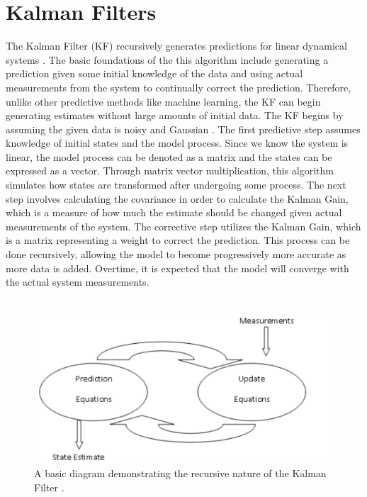 \chapter{Kalman Filters}
\label{Kalman Filters}


The Kalman Filter (KF) recursively generates predictions for linear dynamical systems \cite{inbook}. The basic foundations of the this algorithm include generating a prediction given some initial knowledge of the data and using actual measurements from the system to continually correct the prediction. Therefore,  unlike other predictive methods like machine learning, the KF can begin generating estimates without large amounts of initial data. The KF begins by assuming the given data is noisy and Gaussian \cite{inproceedings, article7}. The first predictive step assumes knowledge of initial states and the model process. Since we know the system is linear, the model process can be denoted as a matrix and the states can be expressed as a vector. Through matrix vector multiplication, this algorithm simulates how states are transformed after undergoing some process. The next step involves calculating the covariance in order to calculate the Kalman Gain, which is a measure of how much the estimate should be changed given actual measurements of the system. The corrective step utilizes the Kalman Gain, which is a matrix representing a weight to correct the prediction. This process can be done recursively, allowing the model to become progressively more accurate as more data is added. Overtime, it is expected that the model will converge with the actual system measurements.
\\  \\

\begin{figure}[h]
    \centering
    \includegraphics[scale = 0.3]{diagram.png}
    \caption{A basic diagram demonstrating the recursive nature of the Kalman Filter \cite{kohanbash_2014}.}
\end{figure}
\newpage


